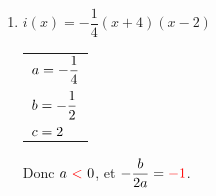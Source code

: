 \documentclass[
	classe=$1^{ere}STI2D$,
]{exercice}
\begin{document}
\begin{multicols}{2}
\begin{enumerate}
		      Donc $a\ \correctionDots{>}\ 0$, et $-\dfrac{b}{2a} = \correctionDots{0}$.

		      \begin{center}
			      [-3][3]
		      \end{center}
		\item $i(x) = -\dfrac{1}{4}(x + 4)(x - 2)$ \hspace{2em} \begin{tabular}{l}
			      $a = \correctionOr{-\dfrac{1}{4}}{.....}$ \\
			      $b = \correctionOr{-\dfrac{1}{2}}{.....}$  \\
			      $c = \correctionOr{2}{.....}$
		      \end{tabular}

		      Donc $a\ \correctionDots{<}\ 0$, et $-\dfrac{b}{2a} = \correctionDots{-1}$.

		      \begin{center}
		      \end{center}
	\end{enumerate}
\end{multicols}
\end{document}
